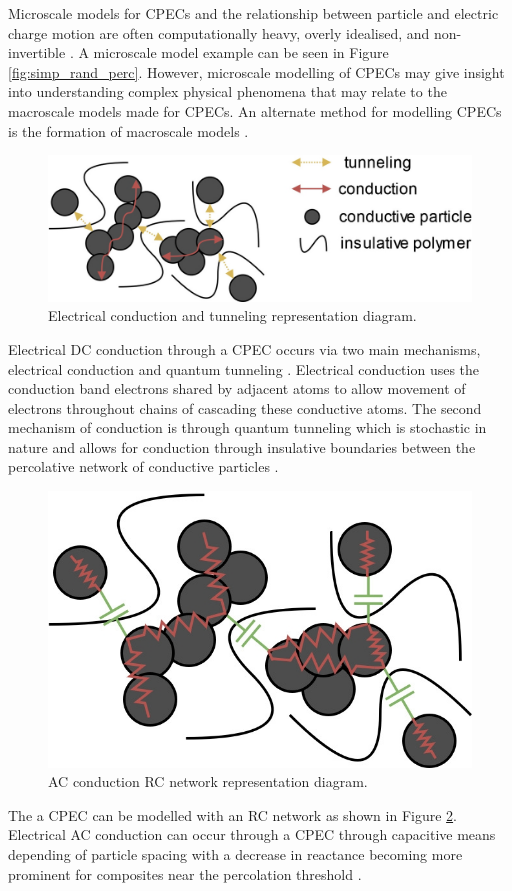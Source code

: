 Microscale models for CPECs and the relationship between particle and electric charge motion are often computationally heavy, overly idealised, and non-invertible \cite{Wang2022}. A microscale model example can be seen in Figure \ref{fig:simp_rand_perc}. However, microscale modelling of CPECs may give insight into understanding complex physical phenomena that may relate to the macroscale models made for CPECs. An alternate method for modelling CPECs is the formation of macroscale models \cite{Neffati2019}.
\begin{figure}[H]
	\centering
	\includegraphics[width=0.7\linewidth]{Figures/conduction-tunneling-mechanisms.jpg}
	\caption{Electrical conduction and tunneling representation diagram.}
	\label{fig:tunneling-model-rep}
\end{figure}
Electrical DC conduction through a CPEC occurs via two main mechanisms, electrical conduction and quantum tunneling \cite{Bloor2006,Duan2014,Zhang2007,Madrid2017}. Electrical conduction uses the conduction band electrons shared by adjacent atoms to allow movement of electrons throughout chains of cascading these conductive atoms. The second mechanism of conduction is through quantum tunneling which is stochastic in nature and allows for conduction through insulative boundaries between the percolative network of conductive particles \cite{Hu2008,Grimaldi2006}. 
\begin{figure}[H]
	\centering
	\includegraphics[width=0.4\linewidth]{Figures/conduction-AC-mechanisms.jpg}
	\caption{AC conduction RC network representation diagram.}
	\label{fig:AC-model-rep}
\end{figure}
The a CPEC can be modelled with an RC network as shown in Figure \ref{fig:AC-model-rep}. Electrical AC conduction can occur through a CPEC through capacitive means depending of particle spacing with a decrease in reactance becoming more prominent for composites near the percolation threshold \cite{HindermannBischoff2001}.


